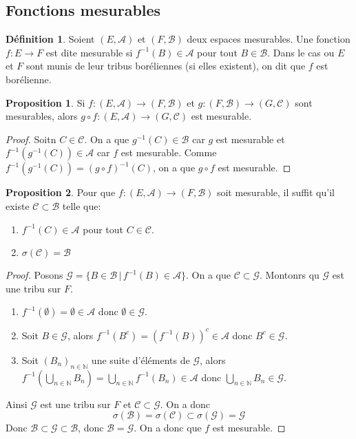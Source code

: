 \documentclass{article}
\theoremstyle{definition}
\newtheorem{definition}{Définition}
\theoremstyle{definition}
\newtheorem{prop}{Proposition}
\theoremstyle{definition}
\theoremstyle{definition}
\theoremstyle{plain}
\theoremstyle{definition}
\begin{document}
\subsection{Fonctions mesurables}

\begin{definition}
	Soient $(E, \mathscr{A})$ et $(F, \mathscr{B})$ deux espaces mesurables. Une fonction $f: E \to F$ est dite mesurable si
	$f^{-1}(B) \in \mathscr{A}$ pour tout $B \in \mathscr{B}$.
	Dans le cas ou $E$ et $F$ sont munis de leur tribus boréliennes (si elles existent), on dit que $f$ est borélienne.
\end{definition}


\begin{prop}
	Si $f: (E, \mathscr{A}) \to (F, \mathscr{B})$ et $g: (F, \mathscr{B}) \to (G, \mathscr{C})$
	sont mesurables, alors $g \circ f : (E, \mathscr{A}) \to (G, \mathscr{C})$ est mesurable.
\end{prop}

\begin{proof}
	Soitn $C \in \mathscr{C}$. On a que $g^{-1}(C) \in \mathscr{B}$ car $g$ est mesurable et
	$f^{-1}(g^{-1}(C)) \in \mathscr{A}$ car $f$ est mesurable.
	Comme $f^{-1}(g^{-1}(C)) = (g \circ f)^{-1}(C)$, on a que $g \circ f$ est mesurable.
\end{proof}


\begin{prop}
	Pour que $f : (E, \mathscr{A}) \to (F, \mathscr{B})$ soit mesurable, il suffit qu'il existe $\mathscr{C} \subset \mathscr{B}$ telle que:
	\begin{enumerate}
		\item $f^{-1}(C) \in \mathscr{A}$ pour tout $C \in \mathscr{C}$.
		\item $\sigma(\mathscr{C}) = \mathscr{B}$
	\end{enumerate}
\end{prop}

\begin{proof}
	Posons $\mathscr{G} = \{ B \in \mathscr{B} \, | \, f^{-1}(B) \in \mathscr{A} \}$. On a que $\mathscr{C} \subset \mathscr{G}$.
	Montonrs qu $\mathscr{G}$ est une tribu sur $F$.
	\begin{enumerate}
		\item $f^{-1}(\emptyset) = \emptyset \in \mathscr{A}$ donc $\emptyset \in \mathscr{G}$.
		\item Soit $B \in \mathscr{G}$, alors $f^{-1}(B^c) = (f^{-1}(B))^c \in \mathscr{A}$ donc $B^c \in \mathscr{G}$.
		\item Soit $(B_n)_{n \in \mathbb{N}}$ une suite d'éléments de $\mathscr{G}$, alors
		      $f^{-1}(\bigcup\limits_{n \in \mathbb{N}} B_n) = \bigcup\limits_{n \in \mathbb{N}} f^{-1}(B_n) \in \mathscr{A}$ donc
		      $\bigcup\limits_{n \in \mathbb{N}} B_n \in \mathscr{G}$.
	\end{enumerate}
	Ainsi $\mathscr{G}$ est une tribu sur $F$ et $\mathscr{C} \subset \mathscr{G}$.
	On a donc
	\[ \sigma(\mathscr{B}) = \sigma(\mathscr{C}) \subset \sigma(\mathscr{G}) = \mathscr{G} \]
	Donc $\mathscr{B} \subset \mathscr{G} \subset \mathscr{B}$, donc $\mathscr{B} = \mathscr{G}$.
	On a donc que $f$ est mesurable.
\end{proof}
\end{document}
